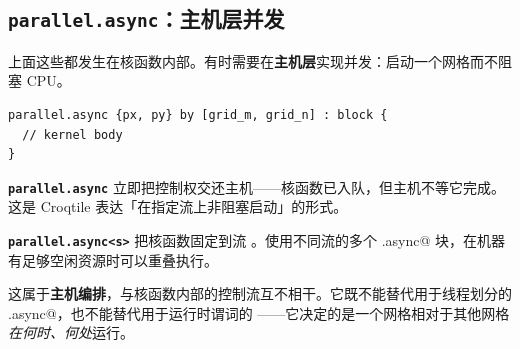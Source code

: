 \subsection*{\texttt{parallel.async}：主机层并发}

上面这些都发生在核函数内部。有时需要在\textbf{主机层}实现并发：启动一个网格而不阻塞 CPU。

\begin{lstlisting}[language=croqtile,caption={parallel.async：主机层并发}]
parallel.async {px, py} by [grid_m, grid_n] : block {
  // kernel body
}
\end{lstlisting}

\textbf{\texttt{parallel.async}} 立即把控制权交还主机——核函数已入队，但主机不等它完成。这是 Croqtile 表达「在指定流上非阻塞启动」的形式。

\textbf{\texttt{parallel.async\textless{}s\textgreater{}}} 把核函数固定到流 \co@s@。使用不同流的多个 \co@parallel.async@ 块，在机器有足够空闲资源时可以重叠执行。

这属于\textbf{主机编排}，与核函数内部的控制流互不相干。它既不能替代用于线程划分的 \co@inthreads.async@，也不能替代用于运行时谓词的 \co@if@——它决定的是一个网格相对于其他网格\emph{在何时、何处}运行。
